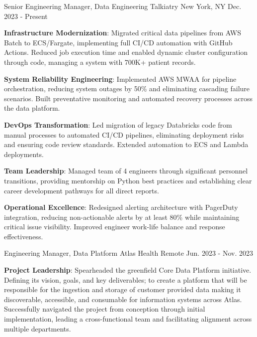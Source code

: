 \begin{cventries}
  \cventry
    {Senior Engineering Manager, Data Engineering}
    {Talkiatry}
    {New York, NY}
    {Dec. 2023 - Present}
    {
      \begin{cvitems}
          \item {\textbf{Infrastructure Modernization}: Migrated critical data pipelines from AWS Batch to ECS/Fargate, implementing full CI/CD automation with GitHub Actions. Reduced job execution time and enabled dynamic cluster configuration through code, managing a system with 700K+ patient records.}
          \item {\textbf{System Reliability Engineering}: Implemented AWS MWAA for pipeline orchestration, reducing system outages by 50\% and eliminating cascading failure scenarios. Built preventative monitoring and automated recovery processes across the data platform.}
          \item {\textbf{DevOps Transformation}: Led migration of legacy Databricks code from manual processes to automated CI/CD pipelines, eliminating deployment risks and ensuring code review standards. Extended automation to ECS and Lambda deployments.}
          \item {\textbf{Team Leadership}: Managed team of 4 engineers through significant personnel transitions, providing mentorship on Python best practices and establishing clear career development pathways for all direct reports.}
          \item {\textbf{Operational Excellence}: Redesigned alerting architecture with PagerDuty integration, reducing non-actionable alerts by at least 80\% while maintaining critical issue visibility. Improved engineer work-life balance and response effectiveness.}
      \end{cvitems}
    }
  \cventry
    {Engineering Manager, Data Platform}
    {Atlas Health}
    {Remote}
    {Jun. 2023 - Nov. 2023}
    {
      \begin{cvitems}
          \item {\textbf{Project Leadership}: Spearheaded the greenfield Core Data Platform initiative. Defining its vision, goals, and key deliverables; to create a platform that will be responsible for the ingestion and storage of customer provided data making it discoverable, accessible, and consumable for information systems across Atlas. Successfully navigated the project from conception through initial implementation, leading a cross-functional team and facilitating alignment across multiple departments.}

\end{cvitems}}
\end{cventries}
